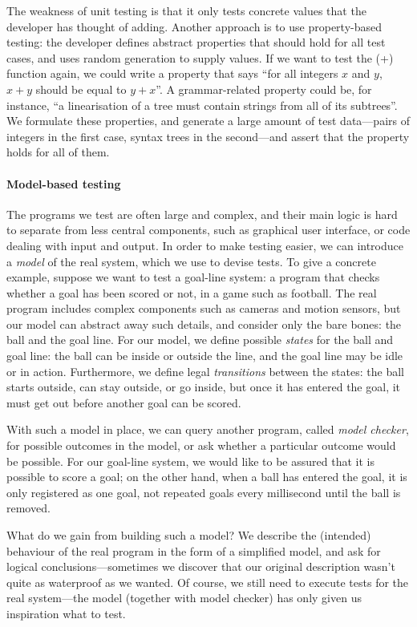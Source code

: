 The weakness of unit testing is that it only tests concrete values
that the developer has thought of adding. Another approach is to use
property-based testing: the developer defines abstract properties that
should hold for all test cases, and uses random generation to supply
values. If we want to test the (+) function again, we could write a
property that says ``for all integers $x$ and $y$, $x+y$ should be
equal to $y+x$''.  A grammar-related property could be, for instance,
``a linearisation of a tree must contain strings from all of its
subtrees''.  We formulate these properties, and generate a large
amount of test data---pairs of integers in the first case, syntax trees in
the second---and assert that the property holds for all of them.

\paragraph{Model-based testing}
The programs we test are often large and complex, and their main logic is hard to
separate from less central components, such as graphical user interface, or
code dealing with input and output. In order to make testing easier, we can introduce
a \emph{model} of the real system, which we use to devise tests. To give a concrete
example, suppose we want to test a goal-line system: a program that checks whether
a goal has been scored or not, in a game such as football. The real program includes
complex components such as cameras and motion sensors, but our model can abstract
away such details, and consider only the bare bones: the ball and the goal line.
For our model, we define possible \emph{states} for the ball and goal line: the
ball can be inside or outside the line, and the goal line may be idle or in action.
Furthermore, we define legal \emph{transitions} between the states: the ball starts
outside, can stay outside, or go inside, but once it has entered the goal, it must
get out before another goal can be scored.

With such a model in place, we can query another program, called \emph{model checker},
for possible outcomes in the model, or ask whether a particular outcome would be
possible. For our goal-line system, we would like to be assured that it is possible
to score a goal; on the other hand, when a ball has entered the goal, it is only
registered as one goal, not repeated goals every millisecond until the ball is
removed.

What do we gain from building such a model? We describe the (intended) behaviour
of the real program in the form of a simplified model, and ask for logical
conclusions---sometimes we discover that our original description wasn't quite
as waterproof as we wanted. Of course, we still need to execute tests for the
real system---the model (together with model checker) has only given us inspiration
what to test.


